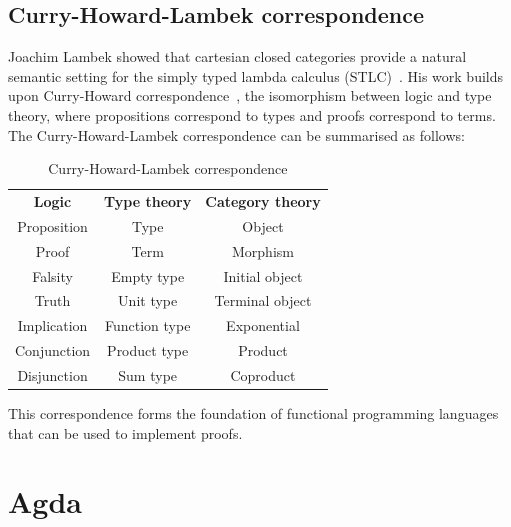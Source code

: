 \documentclass[12pt,a4paper]{report}
\theoremstyle{definition}
\begin{document}
        \subsection{Curry-Howard-Lambek correspondence} \label{subsec: curry-howard-lambek}
        Joachim Lambek showed that cartesian closed categories provide a natural semantic setting for the simply typed lambda calculus (STLC)~\autocite{lambek}. His work builds upon Curry-Howard correspondence~\autocite{curry-howard}, the isomorphism between logic and type theory, where propositions correspond to types and proofs correspond to terms. The Curry-Howard-Lambek correspondence can be summarised as follows:
        \begin{table}[H]
            \centering
            \begin{tabular}{|c|c|c|}
                \hline
                \textbf{Logic} & \textbf{Type theory} & \textbf{Category theory} \\
                \hhline{|=|=|=|}
                Proposition & Type & Object \\
                \hline
                Proof & Term & Morphism \\
                \hline
                Falsity & Empty type & Initial object \\
                \hline
                Truth & Unit type & Terminal object \\
                \hline
                Implication & Function type & Exponential \\
                \hline
                Conjunction & Product type & Product \\
                \hline
                Disjunction & Sum type & Coproduct \\
                \hline
            \end{tabular}
            \caption{Curry-Howard-Lambek correspondence}
            \label{tab: curry-howard-lambek}
        \end{table}
        This correspondence forms the foundation of functional programming languages that can be used to implement proofs. 

    \section{Agda}
\end{document}
